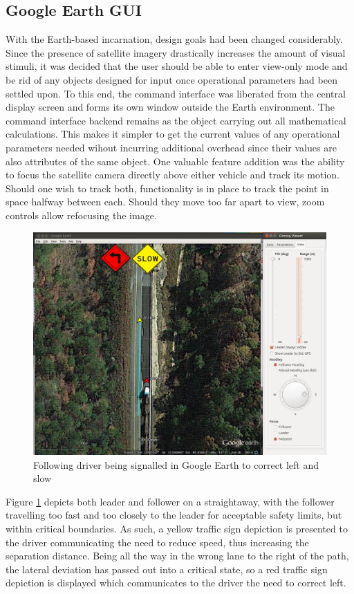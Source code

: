 \subsection{Google Earth GUI} \label{sec:finaldes_earth}

With the Earth-based incarnation, design goals had been changed considerably. Since the presence of satellite imagery drastically increases the amount of  visual stimuli, it was decided that the user should be able to enter view-only mode and be rid of any objects designed for input once operational parameters had been settled upon. To this end, the command interface was liberated from the central display screen and forms its own window outside the Earth environment. The command interface backend remains as the object carrying out all mathematical calculations. This makes it simpler to get the current values of any operational parameters needed wihout incurring additional overhead since their values are also attributes of the same object. One valuable feature addition was the ability to focus the satellite camera directly above either vehicle and track its motion. Should one wish to track both, functionality is in place to track the point in space halfway between each. Should they move too far apart to view, zoom controls allow refocusing the image.

\begin{figure}[ht] \centering 
    \includegraphics[width=5in]{./figs/earth_slow.png}
    \caption{Following driver being signalled in Google Earth to correct left and slow} \label{fig:earth_dst}
\end{figure}

Figure \ref{fig:earth_dst} depicts both leader and follower on a straightaway, with the follower travelling too fast and too closely to the leader for acceptable safety limits, but within critical boundaries. As such, a yellow traffic sign depiction is presented to the driver communicating the need to reduce speed, thus increasing the separation distance. Being all the way in the wrong lane to the right of the path, the lateral deviation has passed out into a critical state, so a red traffic sign depiction is displayed which communicates to the driver the need to correct left.

